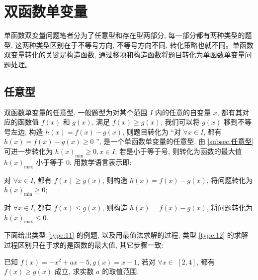 \section{双函数单变量}
单函数双变量问题笔者分为了任意型和存在型两部分, 每一部分都有两种类型的题型, 这两种类型区别在于不等号方向, 不等号方向不同, 转化策略也就不同。单函数双变量转化的关键是构造函数, 通过移项和构造函数将题目转化为单函数单变量问题处理。

\subsection{任意型}\label{subsec:2.3任意型}
双函数单变量的任意型, 一般题型为对某个范围 \(I\) 内的任意的自变量 \(x\), 都有其对应的函数值 \(f(x)\) 和 \(g(x)\), 满足 \(f(x)  \geq  g(x)\), 我们可以将 \(g(x)\) 移到不等号左边, 构造 \(h(x)  = f(x)  -g(x)\), 则题目转化为 “对 \(\forall x \in  I\), 都有 \(h(x)  = f(x)  -g(x)  \geq  0\) ”, 是一个单函数单变量的任意型, 由 \ref{subsec:任意型} 可进一步转化为 \(h{(x) }_{\min } \geq  0, x \in  I\); 若是小于等于号, 则转化为函数的最大值 \(h{(x) }_{\max }\) 小于等于 \(0\), 用数学语言表示即:

\begin{type}\label{type:11}
  对 \(\forall x \in  I\), 都有 \(f(x)  \geq  g(x)\), 则构造 \(h(x)  = f(x)  -g(x)\), 将问题转化为 \(h{(x) }_{\min } \geq  0\);
\end{type}

\begin{type}\label{type:12}
  对 \(\forall x \in  I\), 都有 \(f(x)  \leq  g(x)\), 则构造 \(h(x)  = f(x)  -g(x)\), 将问题转化为 \(h{(x) }_{\max } \leq  0\).
\end{type}


下面给出类型 \ref{type:11} 的例题, 以及用最值法求解的过程, 类型 \ref{type:12} 的求解过程区别只在于求的是函数的最大值, 其它步骤一致:
\begin{variation}\label{variation:2.1.7}
  已知 \(f(x)  =  -{x}^{2} + {ax} -5, g(x)  = x -1\), 若对 \(\forall x \in\)  \(\left\lbrack  {2, 4}\right\rbrack\), 都有 \(f(x)  \geq  g(x)\) 成立, 求实数 \(a\) 的取值范围.
\end{variation}

